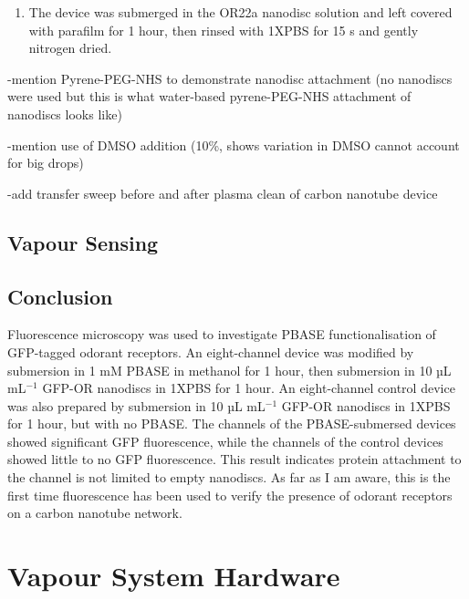 \documentclass[
  a4paper,
]{scrbook}
\providecommand{\tightlist}{%
  \setlength{\itemsep}{0pt}\setlength{\parskip}{0pt}}\usepackage{longtable,booktabs,array}
\begin{document}
\begin{enumerate}
\def\labelenumi{\arabic{enumi}.}
\setcounter{enumi}{6}
\tightlist
\item
  The device was submerged in the OR22a nanodisc solution and left
  covered with parafilm for 1 hour, then rinsed with 1XPBS for 15 s and
  gently nitrogen dried.
\end{enumerate}

-mention Pyrene-PEG-NHS to demonstrate nanodisc attachment (no nanodiscs
were used but this is what water-based pyrene-PEG-NHS attachment of
nanodiscs looks like)

-mention use of DMSO addition (10\%, shows variation in DMSO cannot
account for big drops)

-add transfer sweep before and after plasma clean of carbon nanotube
device

\hypertarget{vapour-sensing}{%
\section{Vapour Sensing}\label{vapour-sensing}}

\hypertarget{conclusion}{%
\section{Conclusion}\label{conclusion}}

Fluorescence microscopy was used to investigate PBASE functionalisation
of GFP-tagged odorant receptors. An eight-channel device was modified by
submersion in 1 mM PBASE in methanol for 1 hour, then submersion in 10
µL mL\(^{-1}\) GFP-OR nanodiscs in 1XPBS for 1 hour. An eight-channel
control device was also prepared by submersion in 10 µL mL\(^{-1}\)
GFP-OR nanodiscs in 1XPBS for 1 hour, but with no PBASE. The channels of
the PBASE-submersed devices showed significant GFP fluorescence, while
the channels of the control devices showed little to no GFP
fluorescence. This result indicates protein attachment to the channel is
not limited to empty nanodiscs. As far as I am aware, this is the first
time fluorescence has been used to verify the presence of odorant
receptors on a carbon nanotube network.

\cleardoublepage
{}
{}
\appendix

\hypertarget{sec-vapour-sensor-components}{%
\chapter{Vapour System Hardware}\label{sec-vapour-sensor-components}}
\end{document}
